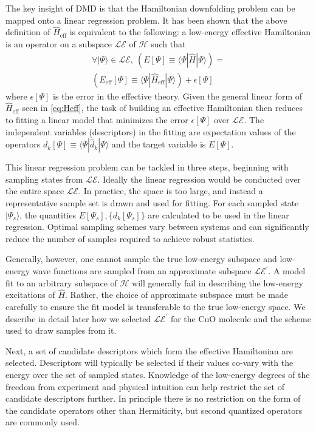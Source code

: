 \documentclass[12pt]{article}
\begin{document}
The key insight of DMD is that the Hamiltonian downfolding problem can be mapped onto a linear regression problem.
It has been shown that the above definition of $\hat{H}_\text{eff}$ is equivalent to the following: a low-energy effective Hamiltonian is an operator on a subspace $\mathcal{LE}$ of $\mathcal{H}$ such that 
\begin{equation}
\begin{split}
\forall |\Psi\rangle \in \mathcal{LE},\ (E[\Psi] \equiv \langle \Psi|\hat{H} | \Psi \rangle)  = \\ (E_\text{eff}[\Psi] \equiv \langle \Psi | \hat{H}_\text{eff} | \Psi \rangle) + \epsilon[\Psi]
\end{split}
\label{eq:DMD}
\end{equation}
where $\epsilon[\Psi]$ is the error in the effective theory.
Given the general linear form of $\hat{H}_\text{eff}$ seen in \eqref{eq:Heff}, 
the task of building an effective Hamiltonian then reduces to fitting a linear model that minimizes the error $\epsilon[\Psi]$ over $\mathcal{LE}$.
The independent variables (descriptors) in the fitting are expectation values of the operators $d_k[\Psi] \equiv \langle \Psi |\hat{d}_k|\Psi \rangle$ and the target variable is $E[\Psi]$.

This linear regression problem can be tackled in three steps, beginning with sampling states from $\mathcal{LE}$.
Ideally the linear regression would be conducted over the entire space $\mathcal{LE}$. 
In practice, the space is too large, and instead a representative sample set is drawn and used for fitting.
For each sampled state $|\Psi_s\rangle$, the quantities $E[\Psi_s], \{d_k[\Psi_s]\}$ are calculated to be used in the linear regression.
Optimal sampling schemes vary between systems and can significantly reduce the number of samples required to achieve robust statistics.

Generally, however, one cannot sample the true low-energy subspace and low-energy wave functions are sampled from an approximate subspace $\mathcal{LE}^\prime$.
A model fit to an arbitrary subspace of $\mathcal{H}$ will generally fail in describing the low-energy excitations of $\hat{H}$.
Rather, the choice of approximate subspace must be made carefully to ensure the fit model is transferable to the true low-energy space.
We describe in detail later how we selected $\mathcal{LE}^\prime$ for the CuO molecule and the scheme used to draw samples from it.

Next, a set of candidate descriptors which form the effective Hamiltonian are selected.
Descriptors will typically be selected if their values co-vary with the energy over the set of sampled states. 
Knowledge of the low-energy degrees of the freedom from experiment and physical intuition can help restrict the set of candidate descriptors further.
In principle there is no restriction on the form of the candidate operators other than Hermiticity, but second quantized operators are commonly used.
\end{document}
